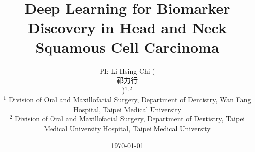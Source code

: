 \documentclass[12pt, a4paper]{article}
\newcommand{\cntext}[1]{\begin{CJK*}{UTF8}{bkai}#1\end{CJK*}}
\begin{document}

\thispagestyle{titlepage}

\clearpage
\title{\Large \vspace{-2.5cm} Deep Learning for Biomarker Discovery in Head and Neck Squamous Cell Carcinoma}

\author{\small PI: Li-Hsing Chi (\cntext{祁力行})$^{1,2}$\\
{\footnotesize $^{1}$ \quad Division of Oral and Maxillofacial Surgery, Department of Dentistry\unskip, 
Wan Fang Hospital\unskip, Taipei Medical University}\\
    
{\footnotesize $^{2}$ \quad Division of Oral and Maxillofacial Surgery, Department of Dentistry\unskip,
    Taipei Medical University Hospital\unskip, Taipei Medical University}\\
    
    

}
\date{\small \today}


\maketitle

\thispagestyle{titlepage}

%
%
\end{document}
